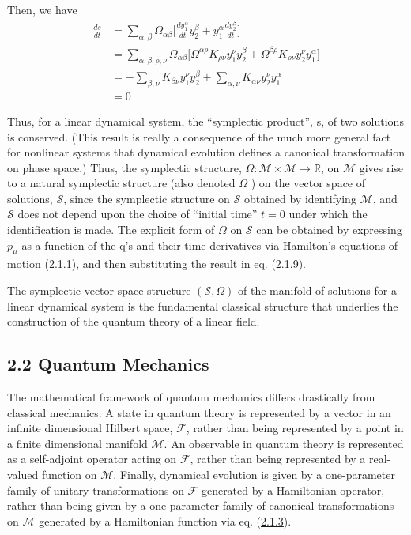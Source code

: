 \documentclass[11pt,a4paper]{article}
\begin{document}
Then, we have
\begin{equation*}
\begin{aligned} \frac{ds}{dt} &= \sum_{\alpha,\beta} \Omega_{\alpha\beta} \Big[ \frac{dy_1^{\alpha}}{dt} y_2^{\beta} + y_1^{\alpha} \frac{dy_2^{\beta}}{dt} \Big] \\ &= \sum_{\alpha,\beta,\rho,\nu} \Omega_{\alpha\beta} \Big[ \Omega^{\alpha\rho} K_{\rho\nu} y_1^{\nu} y_2^{\beta} + \Omega^{\beta\rho} K_{\rho\nu} y_2^{\nu} y_1^{\alpha} \Big] \\ &= - \sum_{\beta,\nu} K_{\beta\nu} y_1^{\nu} y_2^{\beta} + \sum_{\alpha,\nu} K_{\alpha\nu} y_2^{\nu} y_1^{\alpha} \\ &= 0 \end{aligned} \tag{2.1.14}\label{eq:2.1.14}
\end{equation*}

Thus, for a linear dynamical system, the ``symplectic product'', s, of two solutions is conserved. (This result is really a consequence of the much more general fact for nonlinear systems that dynamical evolution defines a canonical transformation on phase space.) Thus, the symplectic structure, \(\Omega: \mathcal{M} \times \mathcal{M} \to \mathbb{R}\), on \(\mathcal{M}\) gives rise to a natural \hypertarget{source-30}{} symplectic structure (also denoted \(\Omega\) ) on the vector space of solutions, \(\mathcal{S}\), since the symplectic structure on \(\mathcal{S}\) obtained by identifying \(\mathcal{M}\), and \(\mathcal{S}\) does not depend upon the choice of ``initial time'' \(t=0\) under which the identification is made. The explicit form of \(\Omega\) on \(\mathcal{S}\) can be obtained by expressing \(p_{\mu}\) as a function of the q's and their time derivatives via Hamilton's equations of motion (\hyperref[eq:2.1.1]{2.1.1}), and then substituting the result in eq. (\hyperref[eq:2.1.9]{2.1.9}).

The symplectic vector space structure \((\mathcal{S},\Omega)\) of the manifold of solutions for a linear dynamical system is the fundamental classical structure that underlies the construction of the quantum theory of a linear field.

\subsection*{2.2 Quantum Mechanics}\hypertarget{sec:2.2}{}

The mathematical framework of quantum mechanics differs drastically from classical mechanics: A state in quantum theory is represented by a vector in an infinite dimensional Hilbert space, \(\mathcal{F}\), rather than being represented by a point in a finite dimensional manifold \(\mathcal{M}\). An observable in quantum theory is represented as a self-adjoint operator acting on \(\mathcal{F}\), rather than being represented by a real-valued function on \(\mathcal{M}\). Finally, dynamical evolution is given by a one-parameter family of unitary transformations on \(\mathcal{F}\) generated by a Hamiltonian operator, rather than being given by a one-parameter family of canonical transformations on \(\mathcal{M}\) generated by a Hamiltonian function via eq. (\hyperref[eq:2.1.3]{2.1.3}).
\end{document}
